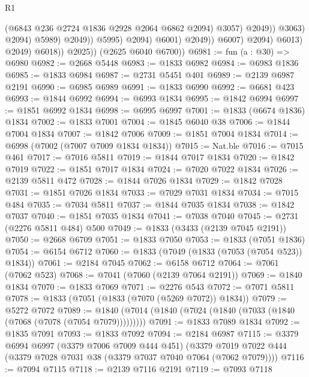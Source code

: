\begin{lexlean}{R1}
\begin{coremodule}
                                                (@6843 @236 @2724 @1836 @2928 @2064 @6862 @2094)
                                                @3057)
                                              @2049))
                                          @3063)
                                        @2094)
                                      @5989)
                                    @2049))
                                @5995)
                              @2094)
                            @6001)
                          @2049))
                      @6007)
                    @2094)
                  @6013)
                @2049)
              @6018))
          @2025))
      (@2625 @6040 @6700))
@6981 := fun (a : @30) => @6980
@6982 := @2668 @5448
@6983 := @1833 @6982
@6984 := @6983 @1836
@6985 := @1833 @6984
@6987 := @2731 @5451 @401
@6989 := @2139 @6987 @2191
@6990 := @6985 @6989
@6991 := @1833 @6990
@6992 := @6681 @423
@6993 := @1844 @6992
@6994 := @6993 @1834
@6995 := @1842 @6994
@6997 := @1851 @6992 @1834
@6998 := @6995 @6997
@7001 := @1833 (@6674 @1836) @1834
@7002 := @1833 @7001
@7004 := @1845 @6040 @38
@7006 := @1844 @7004 @1834
@7007 := @1842 @7006
@7009 := @1851 @7004 @1834
@7014 := @6998 (@7002 (@7007 @7009 @1834 @1834))
@7015 := Nat.ble
@7016 := @7015 @461
@7017 := @7016 @5811
@7019 := @1844 @7017 @1834
@7020 := @1842 @7019
@7022 := @1851 @7017 @1834
@7024 := @7020 @7022 @1834
@7026 := @2139 @5811 @472
@7028 := @1844 @7026 @1834
@7029 := @1842 @7028
@7031 := @1851 @7026 @1834
@7033 := @7029 @7031 @1834
@7034 := @7015 @484
@7035 := @7034 @5811
@7037 := @1844 @7035 @1834
@7038 := @1842 @7037
@7040 := @1851 @7035 @1834
@7041 := @7038 @7040
@7045 := @2731 (@2276 @5811 @484) @500
@7049 := @1833 (@3433 (@2139 @7045 @2191))
@7050 := @2668 @6709
@7051 := @1833 @7050
@7053 := @1833 (@7051 @1836)
@7054 := @6154 @6712
@7060 := @1833 (@7049 (@1833 (@7053 (@7054 @523)) @1834))
@7061 := @2184 @7045
@7062 := @6158 @6712
@7064 := @7061 (@7062 @523)
@7068 := @7041 (@7060 (@2139 @7064 @2191))
@7069 := @1840 @1834
@7070 := @1833 @7069
@7071 := @2276 @543
@7072 := @7071 @5811
@7078 := @1833 (@7051 (@1833 (@7070 (@5269 @7072)) @1834))
@7079 := @5272 @7072
@7089 := @1840 (@7014 (@1840 (@7024 (@1840 (@7033 (@1840 (@7068 (@7078 (@7054 @7079)))))))))
@7091 := @1833 @7089 @1834
@7092 := @1835 @7091
@7093 := @1833 @7092
@7094 := @2184 @6987
@7115 := @3379
    @6994
    @6997
    (@3379 @7006 @7009 @444 @451)
    (@3379 @7019 @7022 @444 (@3379 @7028 @7031 @38 (@3379 @7037 @7040 @7064 (@7062 @7079))))
@7116 := @7094 @7115
@7118 := @2139 @7116 @2191
@7119 := @7093 @7118

\end{coremodule}
\end{lexlean}
